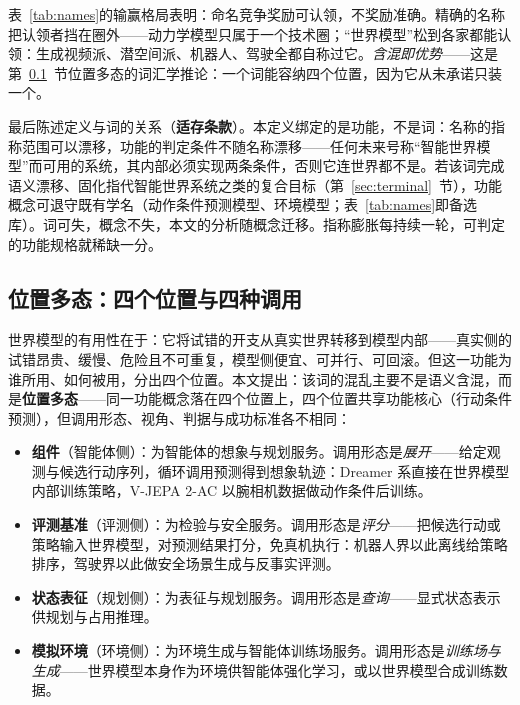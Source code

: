 \documentclass[10pt,fontset=fandol]{ctexart}
\begin{document}
表~\ref{tab:names}的输赢格局表明：命名竞争奖励可认领，不奖励准确。精确的名称把认领者挡在圈外——动力学模型只属于一个技术圈；“世界模型”松到各家都能认领：生成视频派、潜空间派、机器人、驾驶全都自称过它。\emph{含混即优势}——这是第~\ref{sec:positions}~节位置多态的词汇学推论：一个词能容纳四个位置，因为它从未承诺只装一个。

最后陈述定义与词的关系（\textbf{适存条款}）。本定义绑定的是功能，不是词：名称的指称范围可以漂移，功能的判定条件不随名称漂移——任何未来号称“智能世界模型”而可用的系统，其内部必须实现两条条件，否则它连世界都不是。若该词完成语义漂移、固化指代智能世界系统之类的复合目标（第~\ref{sec:terminal}~节），功能概念可退守既有学名（动作条件预测模型、环境模型；表~\ref{tab:names}即备选库）。词可失，概念不失，本文的分析随概念迁移。指称膨胀每持续一轮，可判定的功能规格就稀缺一分。

\subsection{位置多态：四个位置与四种调用}\label{sec:positions}

世界模型的有用性在于：它将试错的开支从真实世界转移到模型内部——真实侧的试错昂贵、缓慢、危险且不可重复，模型侧便宜、可并行、可回滚。但这一功能为谁所用、如何被用，分出四个位置。本文提出：该词的混乱主要不是语义含混，而是\textbf{位置多态}——同一功能概念落在四个位置上，四个位置共享功能核心（行动条件预测），但调用形态、视角、判据与成功标准各不相同：

\begin{itemize}
\item \textbf{组件}（智能体侧）：为智能体的想象与规划服务。调用形态是\emph{展开}——给定观测与候选行动序列，循环调用预测得到想象轨迹：Dreamer 系直接在世界模型内部训练策略\cite{hafner2025inside}，V-JEPA 2-AC 以腕相机数据做动作条件后训练\cite{meta2025vjepa2}。
\item \textbf{评测基准}（评测侧）：为检验与安全服务。调用形态是\emph{评分}——把候选行动或策略输入世界模型，对预测结果打分，免真机执行：机器人界以此离线给策略排序\cite{onex2026worldmodel}，驾驶界以此做安全场景生成与反事实评测\cite{wayve2025gaia2}。
\item \textbf{状态表征}（规划侧）：为表征与规划服务。调用形态是\emph{查询}——显式状态表示供规划与占用推理\cite{tolman1948,okeefe1978}。
\item \textbf{模拟环境}（环境侧）：为环境生成与智能体训练场服务。调用形态是\emph{训练场与生成}——世界模型本身作为环境供智能体强化学习\cite{qwen2026agentworld,deepmind2025genie3}，或以世界模型合成训练数据\cite{nvidia2025synthetic}。
\end{itemize}
\end{document}
